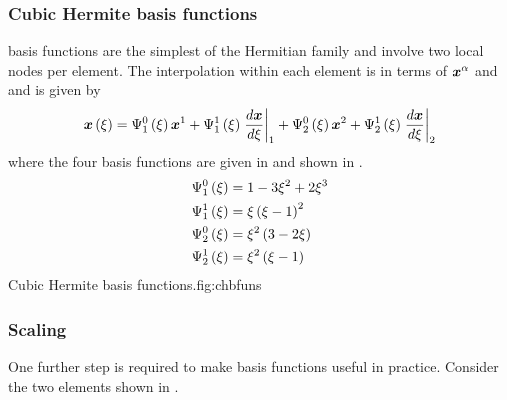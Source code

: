\subsubsection{Cubic Hermite basis functions}

\Cubicherm basis functions are the simplest of the Hermitian family and
involve two local nodes per element. The interpolation within each element is
in terms of $\nodept{\vect{x}}{\alpha}$ and 
and is given by 
\begin{equation}
  \fnof{\vect{x}}{\xi}=\chbfn{1}{0}{\xi}\nodept{\vect{x}}{1}+\chbfn{1}{1}{\xi}
  \evalat{\dby{\vect{x}}{\xi}}{1}+\chbfn{2}{0}{\xi}\nodept{\vect{x}}{2}+
  \chbfn{2}{1}{\xi}\evalat{\dby{\vect{x}}{\xi}}{2}
  \label{eqn:chxiinterpolation}
\end{equation}
where the four \onedal \cubicherm basis functions are given in 
 and shown in .
\begin{equation}
  \begin{split}
    \chbfn{1}{0}{\xi} &= 1-3\xi^{2}+2\xi^{3} \\
    \chbfn{1}{1}{\xi} &= \xi\pbrac{\xi-1}^{2} \\
    \chbfn{2}{0}{\xi} &= \xi^{2}\pbrac{3-2\xi} \\
    \chbfn{2}{1}{\xi} &= \xi^{2}\pbrac{\xi-1}
  \end{split}
  \label{eqn:chbfuns}
\end{equation}
{Cubic Hermite basis functions.}{fig:chbfuns}

\subsubsection{Scaling}

One further step is required to make \cubicherm basis functions useful in
practice.  Consider the two \cubicherm elements shown in
.



